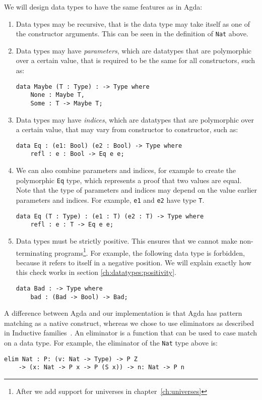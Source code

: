 We will design data types to have the same features as in Agda:
\begin{enumerate}
\item Data types may be recursive, that is the data type may take itself as one of the constructor arguments. This can be seen in the definition of \verb|Nat| above.
\item Data types may have \emph{parameters}, which are datatypes that are polymorphic over a certain value, that is required to be the same for all constructors, such as:
\begin{lstlisting}
data Maybe (T : Type) : -> Type where
    None : Maybe T,
    Some : T -> Maybe T;
\end{lstlisting}
\item Data types may have \emph{indices}, which are datatypes that are polymorphic over a certain value, that may vary from constructor to constructor, such as:
\begin{lstlisting}
data Eq : (e1: Bool) (e2 : Bool) -> Type where
    refl : e : Bool -> Eq e e;
\end{lstlisting}
\item We can also combine parameters and indices, for example to create the polymorphic \verb|Eq| type, which represents a proof that two values are equal. Note that the type of parameters and indices may depend on the value earlier parameters and indices. For example, \verb|e1| and \verb|e2| have type \verb|T|.
\begin{lstlisting}
data Eq (T : Type) : (e1 : T) (e2 : T) -> Type where
    refl : e : T -> Eq e e;
\end{lstlisting}
\item Data types must be strictly positive. This ensures that we cannot make non-terminating programs\footnote{After we add support for universes in chapter~\ref{ch:universes}}. For example, the following data type is forbidden, because it refers to itself in a negative position. We will explain exactly how this check works in section \ref{ch:datatypes:positivity}.
\begin{lstlisting}
data Bad : -> Type where
	bad : (Bad -> Bool) -> Bad;
\end{lstlisting}
\end{enumerate}

A difference between Agda and our implementation is that Agda has pattern matching as a native construct, whereas we chose to use eliminators as described in Inductive families~\cite{eliminators}. An eliminator is a function that can be used to case match on a data type. For example, the eliminator of the \verb|Nat| type above is:
\begin{lstlisting}
elim Nat : P: (v: Nat -> Type) -> P Z 
	-> (x: Nat -> P x -> P (S x)) -> n: Nat -> P n
\end{lstlisting}

